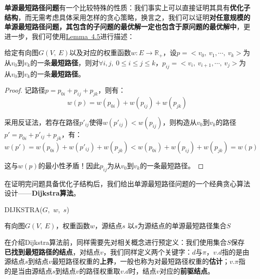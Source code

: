 \documentclass[12pt,a4paper,violet,oneside]{bbe}
\begin{document}
\textbf{单源最短路径问题}有一个比较特殊的性质：我们事实上可以直接证明其具有\textbf{优化子结构}，而无需考虑具体采用怎样的贪心策略，换言之，我们可以证明\textbf{对任意规模的单源最短路径问题，其包含的子问题的最优解一定也包含于原问题的最优解中}，更进一步，我们可使用\hyperref[le4.1]{Lemma~4.5}进行描述：
\begin{lemma}\label{le4.1}
	给定有向图$G(V,~E)$以及对应的权重函数$w: E\to \mathbb{R}_+$，设$p=<v_0,~v_1,\cdots,~v_k>$为从$v_0$到$v_k$的一条\textbf{最短路径}，则对$\forall i,j,~0\leqslant i\leqslant j\leqslant k$，$p_{ij}=<v_i,~v_{i+1},\cdots,~v_j>$为从$v_0$到$v_k$的一条\textbf{最短路径}。
\end{lemma}
\begin{proof}
	记路径$p=p_{0i}+p_{ij}+p_{jk}$，则有：
	$$
	w(p)=w(p_{0i})+w(p_{ij})+w(p_{jk})
	$$
	
	采用反证法，若存在路径$p'_{ij}$使得$w(p'_{ij})<w(p_{ij})$，则构造从$v_0$到$v_k$的路径$p'=p_{0i}+p'_{ij}+p_{jk}$，有：
	$$
	w(p')=w(p_{0i})+w(p'_{ij})+w(p_{jk})<w(p_{0i})+w(p_{ij})+w(p_{jk})=w(p)
	$$
	
	这与$w(p)$的最小性矛盾！因此$p_{ij}$为从$v_0$到$v_k$的一条最短路径。
\end{proof}

在证明完问题具备优化子结构后，我们给出单源最短路径问题的一个经典贪心算法设计——\textbf{Dijkstra算法}。
\\
\begin{algorithm}[H]
	\caption{DIJKSTRA($G$,~$w$,~$s$)}
	\label{alo4.5}
	\begin{algorithmic}[1] 
		\Require 有向图$G(V,~E)$，权重函数$w$，源结点$s$
		\Ensure 以$s$为源结点的单源最短路径集合$S$
		\EndFor
		\textcolor{blue}{}
		\textcolor{blue}{}
		\textcolor{blue}{}
		\EndFor
		\EndWhile
	\end{algorithmic} 
\end{algorithm}

在介绍Dijkstra算法前，同样需要先对相关概念进行预定义：我们使用集合$S$保存\textbf{已找到最短路径的结点}，对结点$v$，我们同样定义两个关键字：$d$与$\pi$，$v.d$指的是由源结点$s$到结点$v$最短路径权重的\textbf{上界}，一般也称为对最短路径权重的\textbf{估计}；$v.\pi$指的是当由源结点$s$到结点$v$的路径权重取$v.d$时，结点$v$对应的\textbf{前驱结点}。
\end{document}

